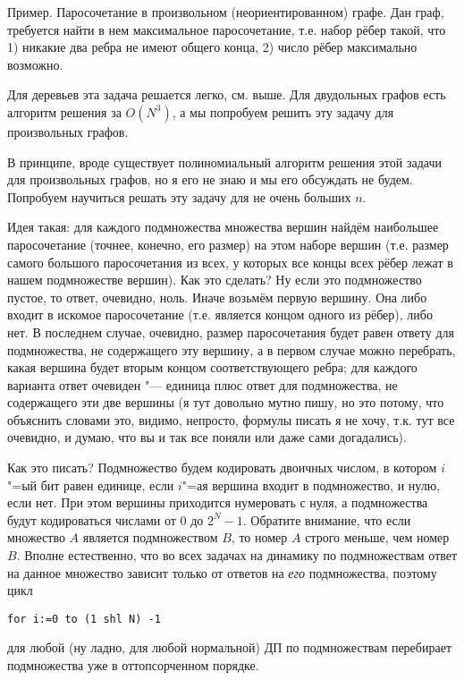 Пример. Паросочетание в произвольном (неориентированном) графе. Дан граф, требуется найти в нем
максимальное паросочетание, т.е. набор рёбер такой, что 1) никакие два ребра не имеют общего конца, 2) число
рёбер максимально возможно.

Для деревьев эта задача решается легко, см. выше. Для двудольных графов есть алгоритм решения за $O(N^3)$, а мы попробуем решить эту задачу для произвольных графов.

В принципе, вроде существует полиномиальный алгоритм решения этой задачи для произвольных графов, но я его не знаю и мы его обсуждать не будем. Попробуем научиться
решать эту задачу для не очень больших $n$.

Идея такая: для каждого подмножества множества вершин найдём наибольшее паросочетание (точнее, конечно, его размер) на этом наборе
вершин (т.е. размер самого большого паросочетания из всех, у которых все концы всех рёбер лежат в нашем подмножестве вершин). Как это сделать? Ну если это подмножество пустое, то ответ, очевидно, ноль. Иначе возьмём
первую вершину. Она либо входит в искомое паросочетание (т.е. является концом одного из рёбер), либо
нет. В последнем случае, очевидно, размер паросочетания будет равен ответу для подмножества, не
содержащего эту вершину, а в первом случае можно перебрать, какая вершина будет вторым концом
соответствующего ребра; для каждого варианта ответ очевиден "--- единица плюс ответ для
подмножества, не содержащего эти две вершины (я тут довольно мутно пишу, но это потому, что
объяснить словами это, видимо, непросто, формулы писать я не хочу, т.к. тут все очевидно, и думаю,
что вы и так все поняли или даже сами догадались).

Как это писать? Подмножество будем кодировать двоичных числом, в котором $i$"=ый бит равен единице,
если $i$"=ая вершина входит в подмножество, и нулю, если нет. При этом вершины приходится нумеровать
с нуля, а подмножества будут кодироваться числами от 0 до $2^N-1$. Обратите внимание, что если 
множество $A$ является подмножеством $B$, то номер $A$ строго меньше, чем номер $B$. Вполне
естественно, что во всех задачах на динамику по подмножествам ответ на данное множество зависит
только от ответов на \textit{его} подмножества, поэтому цикл

\begin{codesampleo}\begin{verbatim}
for i:=0 to (1 shl N) -1
\end{verbatim}
\end{codesampleo}
для любой (ну ладно, для любой нормальной) ДП по подмножествам перебирает подмножества уже в оттопсорченном порядке.

